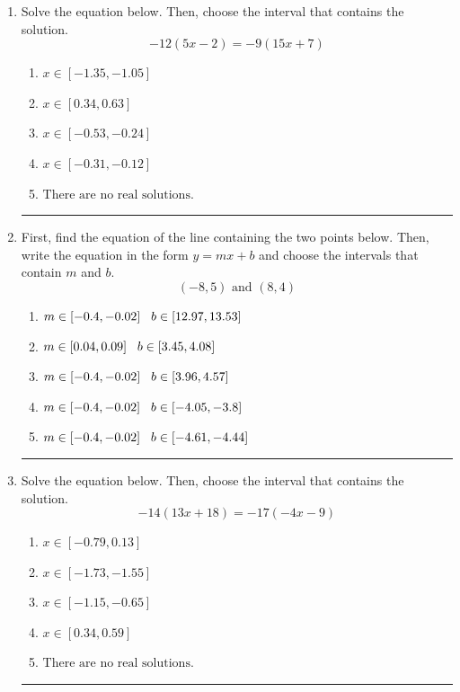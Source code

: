 \documentclass[14pt]{extbook}
\newcommand{\litem}[1]{\item#1\hspace*{-1cm}\rule{\textwidth}{0.4pt}}
\begin{document}
\begin{enumerate}
{\begin{enumerate}[label=\Alph*.]
\end{enumerate} }
\litem{
Solve the equation below. Then, choose the interval that contains the solution.\[ -12(5x -2) = -9(15x + 7) \]\begin{enumerate}[label=\Alph*.]
\item \( x \in [-1.35, -1.05] \)
\item \( x \in [0.34, 0.63] \)
\item \( x \in [-0.53, -0.24] \)
\item \( x \in [-0.31, -0.12] \)
\item \( \text{There are no real solutions.} \)

\end{enumerate} }
\litem{
First, find the equation of the line containing the two points below. Then, write the equation in the form $ y=mx+b $ and choose the intervals that contain $m$ and $b$.\[ (-8, 5) \text{ and } (8, 4) \]\begin{enumerate}[label=\Alph*.]
\item \( m \in [-0.4, -0.02] \hspace*{3mm} b \in [12.97, 13.53] \)
\item \( m \in [0.04, 0.09] \hspace*{3mm} b \in [3.45, 4.08] \)
\item \( m \in [-0.4, -0.02] \hspace*{3mm} b \in [3.96, 4.57] \)
\item \( m \in [-0.4, -0.02] \hspace*{3mm} b \in [-4.05, -3.8] \)
\item \( m \in [-0.4, -0.02] \hspace*{3mm} b \in [-4.61, -4.44] \)

\end{enumerate} }
\litem{
Solve the equation below. Then, choose the interval that contains the solution.\[ -14(13x + 18) = -17(-4x -9) \]\begin{enumerate}[label=\Alph*.]
\item \( x \in [-0.79, 0.13] \)
\item \( x \in [-1.73, -1.55] \)
\item \( x \in [-1.15, -0.65] \)
\item \( x \in [0.34, 0.59] \)
\item \( \text{There are no real solutions.} \)


\end{enumerate}}
\end{enumerate}
\end{document}
